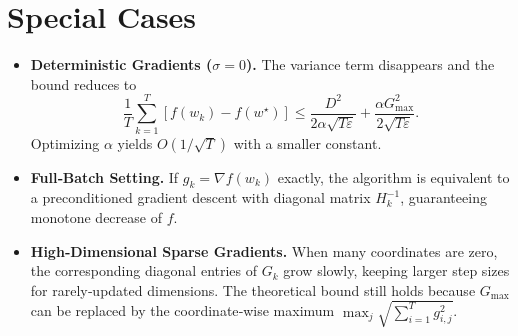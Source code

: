 \documentclass{article}
\begin{document}
\section*{Special Cases}
\begin{itemize}
\item \textbf{Deterministic Gradients ($\sigma=0$).}  
The variance term disappears and the bound reduces to
\[
\frac{1}{T}\sum_{k=1}^{T}[f(w_k)-f(w^\star)]
\le \frac{D^2}{2\alpha\sqrt{T\varepsilon}}
      +\frac{\alpha G_{\max}^2}{2\sqrt{T\varepsilon}} .
\]
Optimizing $\alpha$ yields $O(1/\sqrt{T})$ with a smaller constant.
\item \textbf{Full‑Batch Setting.}  
If $g_k=\nabla f(w_k)$ exactly, the algorithm is equivalent to a
preconditioned gradient descent with diagonal matrix $H_k^{-1}$, guaranteeing
monotone decrease of $f$.
\item \textbf{High‑Dimensional Sparse Gradients.}  
When many coordinates are zero, the corresponding diagonal entries of $G_k$
grow slowly, keeping larger step sizes for rarely‑updated dimensions. The
theoretical bound still holds because $G_{\max}$ can be replaced by the
coordinate‑wise maximum $ \max_j \sqrt{\sum_{i=1}^{T} g_{i,j}^2}$.
\end{itemize}
\end{document}

